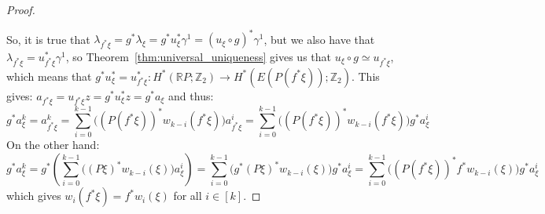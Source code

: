 \begin{proof}
\begin{center}
\end{center}
So, it is true that $\lambda_{f^*\xi}=g^*\lambda_{\xi}=g^*u_{\xi}^*\gamma^1=(u_{\xi}\circ g)^*\gamma^1$, but we also have that $\lambda_{f^*\xi}=u^*_{f^*\xi}\gamma^1$, so Theorem~\ref{thm:universal_uniqueness} gives us that $u_{\xi}\circ g\simeq u_{f^*\xi}$, which means that $g^*u^*_{\xi}=u^*_{f^*\xi}:H^*(\mathbb{R}P;\mathbb{Z}_2)\to H^*(E(P(f^*\xi));\mathbb{Z}_2)$. This gives: $a_{f^*\xi}=u_{f^*\xi}z=g^*u^*_{\xi}z=g^*a_{\xi}$ and thus:
\[g^*a^k_{\xi}=a^k_{f^*\xi}=\sum_{i=0}^{k-1}\Big((P(f^*\xi))^*w_{k-i}(f^*\xi)\Big)a_{f^*\xi}^i=\sum_{i=0}^{k-1}\Big((P(f^*\xi))^*w_{k-i}(f^*\xi)\Big)g^*a_{\xi}^i\]
On the other hand:
\[g^*a^k_{\xi}=g^*\left(\sum_{i=0}^{k-1}\Big((P\xi)^*w_{k-i}(\xi)\Big)a_{\xi}^i\right)=\sum_{i=0}^{k-1}\Big(g^*(P\xi)^*w_{k-i}(\xi)\Big)g^*a_{\xi}^i=\sum_{i=0}^{k-1}\Big((P(f^*\xi))^*f^*w_{k-i}(\xi)\Big)g^*a_{\xi}^i\]
which gives $w_i(f^*\xi)=f^*w_i(\xi)$ for all $i\in[k]$.
\end{proof}

